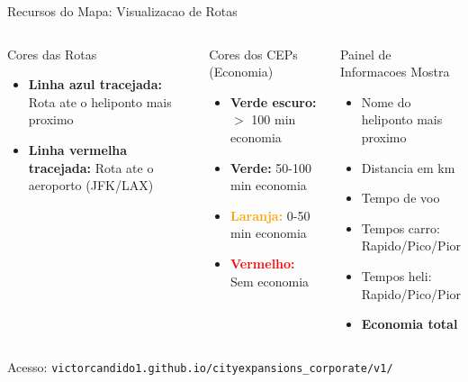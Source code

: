 \documentclass[aspectratio=169,9pt]{beamer}
\begin{document}
\begin{frame}{Recursos do Mapa: Visualizacao de Rotas}
\begin{columns}
\begin{exampleblock}{Cores das Rotas}
\begin{itemize}
    \item \textcolor{revoBlue}{\textbf{Linha azul tracejada:}} Rota ate o heliponto mais proximo
    \item \textcolor{revoRed}{\textbf{Linha vermelha tracejada:}} Rota ate o aeroporto (JFK/LAX)
\end{itemize}
\end{exampleblock}

\begin{block}{Cores dos CEPs (Economia)}
\begin{itemize}
    \item \textcolor{green!60!black}{\textbf{Verde escuro:}} $>$ 100 min economia
    \item \textcolor{green!40!black}{\textbf{Verde:}} 50-100 min economia
    \item \textcolor{orange}{\textbf{Laranja:}} 0-50 min economia
    \item \textcolor{red}{\textbf{Vermelho:}} Sem economia
\end{itemize}
\end{block}

\begin{alertblock}{Painel de Informacoes Mostra}
\begin{itemize}
    \item Nome do heliponto mais proximo
    \item Distancia em km
    \item Tempo de voo
    \item Tempos carro: Rapido/Pico/Pior
    \item Tempos heli: Rapido/Pico/Pior
    \item \textbf{Economia total}
\end{itemize}
\end{alertblock}
\end{columns}

\vspace{0.5em}
\begin{center}
\footnotesize{Acesso: \texttt{victorcandido1.github.io/cityexpansions\_corporate/v1/}}
\end{center}
\end{frame}
\end{document}

